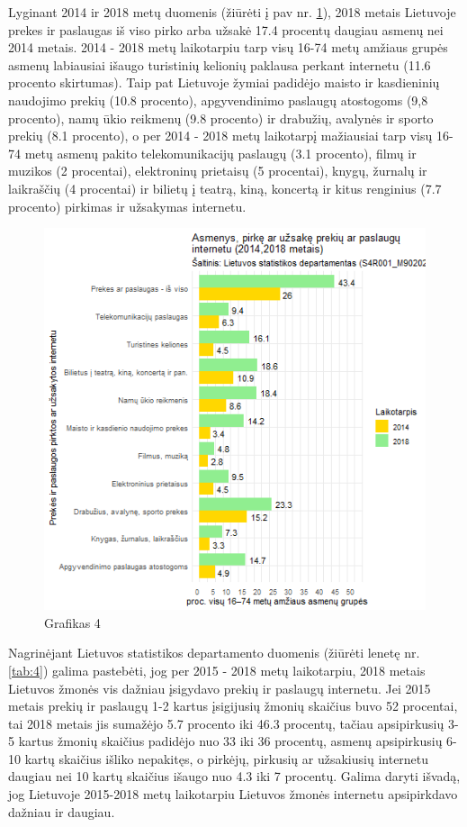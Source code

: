 \documentclass[12pt, titlepage]{article}
\begin{document}
Lyginant 2014 ir 2018 metų duomenis (žiūrėti į pav nr. \ref{fig:5}), 2018 metais Lietuvoje prekes ir paslaugas iš viso pirko arba užsakė 17.4 procentų daugiau asmenų nei 2014 metais. 2014 - 2018 metų laikotarpiu tarp visų 16-74 metų amžiaus grupės asmenų labiausiai išaugo turistinių kelionių paklausa perkant internetu (11.6 procento skirtumas). Taip pat Lietuvoje žymiai padidėjo maisto ir kasdieninių naudojimo prekių (10.8 procento), apgyvendinimo paslaugų atostogoms (9,8 procento), namų ūkio reikmenų (9.8 procento) ir drabužių, avalynės ir sporto prekių (8.1 procento), o per 2014 - 2018 metų laikotarpį mažiausiai tarp visų 16-74 metų asmenų pakito telekomunikacijų paslaugų (3.1 procento), filmų ir muzikos (2 procentai), elektroninų prietaisų (5 procentai), knygų, žurnalų ir laikraščių (4 procentai) ir bilietų į teatrą, kiną, koncertą ir kitus renginius (7.7 procento) pirkimas ir užsakymas internetu. 
\begin{figure}[H]
\center
\includegraphics[scale=0.85]{Grafikai/2.png} 
\caption{Grafikas 4}
\label{fig:5}
\end{figure}
\medskip
Nagrinėjant Lietuvos statistikos departamento duomenis (žiūrėti lenetę nr. \ref{tab:4}) galima pastebėti, jog per 2015 - 2018 metų laikotarpiu, 2018 metais Lietuvos žmonės vis dažniau įsigydavo prekių ir paslaugų internetu. Jei 2015 metais prekių ir paslaugų 1-2 kartus įsigijusių žmonių skaičius buvo 52 procentai, tai 2018 metais jis sumažėjo 5.7 procento iki 46.3 procentų, tačiau apsipirkusių  3-5 kartus žmonių skaičius padidėjo nuo 33 iki 36 procentų, asmenų apsipirkusių 6-10 kartų skaičius išliko nepakitęs, o pirkėjų, pirkusių ar užsakiusių internetu daugiau nei 10 kartų skaičius išaugo nuo 4.3 iki 7 procentų. Galima daryti išvadą, jog Lietuvoje 2015-2018 metų laikotarpiu Lietuvos žmonės internetu apsipirkdavo dažniau ir daugiau.
\end{document}

